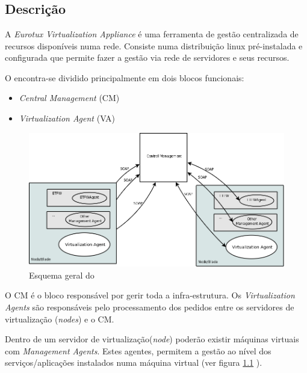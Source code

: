 \chapter{\textsf{\acronym}}
\section*{Descrição}
A \emph{Eurotux Virtualization Appliance} é uma ferramenta de gestão centralizada de recursos disponíveis numa rede. Consiste numa distribuição linux pré-instalada e configurada que permite fazer a gestão via rede de servidores e seus recursos.

O \acronym encontra-se dividido principalmente em dois blocos funcionais:

\begin{itemize}
	\item \emph{Central Management} (CM)
        \item \emph{Virtualization Agent} (VA)
\end{itemize}

\begin{figure}[H]
	\begin{center}
	\includegraphics[scale=0.35]{screenshots/etva_blocos.png}
	\caption{Esquema geral do \acronym}
	\label{fig:etva_blocos}
	\end{center}
\end{figure}

O CM é o bloco responsável por gerir toda a infra-estrutura.
Os \emph{Virtualization Agents} são responsáveis pelo processamento dos pedidos entre os servidores de virtualização (\emph{nodes}) e o CM.

Dentro de um servidor de virtualização(\emph{node}) poderão existir máquinas virtuais com \emph{Management Agents}. Estes agentes, permitem a gestão ao nível dos serviços/aplicações instalados numa máquina virtual (ver figura \ref{fig:etva_blocos} ).

